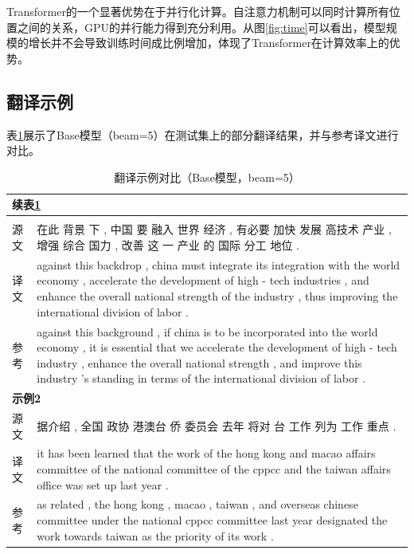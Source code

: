 \documentclass[12pt,a4paper]{article}
\begin{document}
Transformer的一个显著优势在于并行化计算。自注意力机制可以同时计算所有位置之间的关系，GPU的并行能力得到充分利用。从图\ref{fig:time}可以看出，模型规模的增长并不会导致训练时间成比例增加，体现了Transformer在计算效率上的优势。

\subsection{翻译示例}

表\ref{tab:samples}展示了Base模型（beam=5）在测试集上的部分翻译结果，并与参考译文进行对比。

\begin{longtable}{p{}p{}}
    \caption{翻译示例对比（Base模型，beam=5）} \label{tab:samples} \\
    \toprule
    \endfirsthead
    \multicolumn{2}{l}{\small 续表\ref{tab:samples}} \\
    \toprule
    \endhead
    \bottomrule
    \endfoot
    \multicolumn{2}{l}{\textbf{示例1}} \\
    \midrule
    源文 & 在此 背景 下 , 中国 要 融入 世界 经济 , 有必要 加快 发展 高技术 产业 , 增强 综合 国力 , 改善 这 一 产业 的 国际 分工 地位 . \\
    译文 & against this backdrop , china must integrate its integration with the world economy , accelerate the development of high - tech industries , and enhance the overall national strength of the industry , thus improving the international division of labor . \\
    参考 & against this background , if china is to be incorporated into the world economy , it is essential that we accelerate the development of high - tech industry , enhance the overall national strength , and improve this industry 's standing in terms of the international division of labor . \\
    \midrule
    \multicolumn{2}{l}{\textbf{示例2}} \\
    \midrule
    源文 & 据介绍 , 全国 政协 港澳台 侨 委员会 去年 将对 台 工作 列为 工作 重点 . \\
    译文 & it has been learned that the work of the hong kong and macao affairs committee of the national committee of the cppcc and the taiwan affairs office was set up last year . \\
    参考 & as related , the hong kong , macao , taiwan , and overseas chinese committee under the national cppcc committee last year designated the work towards taiwan as the priority of its work . \\

\end{longtable}
\end{document}
